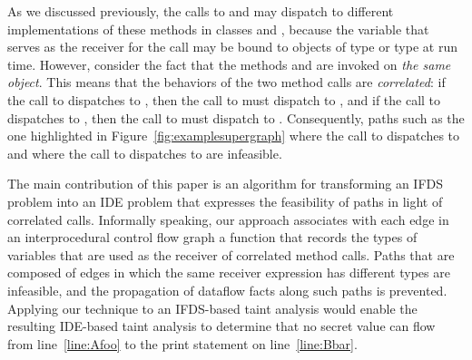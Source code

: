 As we discussed previously, the calls to  and  may dispatch
to different implementations of these methods in classes  and , 
because the variable  that serves as the receiver for the call may be bound to
 objects of type  or type  at run time. 
However, consider the fact that the methods  and  are invoked
on \textit{the same object}. This means that the behaviors of the two method calls
are \textit{correlated}: if the call to  dispatches to ,
then the call to  must dispatch to , and if the call
to  dispatches to , then the call to  must 
dispatch to .  Consequently, paths such as the one highlighted in
Figure~\ref{fig:examplesupergraph} where the call to  dispatches 
to  and where the call to  dispatches to 
are infeasible.  

The main contribution of this paper is an algorithm for transforming an IFDS problem 
into an IDE problem that expresses the feasibility of paths
in light of correlated calls.
Informally speaking, our approach associates with each edge in an
interprocedural control flow graph a function that records the types of 
variables that are used as the receiver of correlated method calls. Paths that 
are composed of edges in which the same receiver expression has different types
are infeasible, and the propagation of dataflow facts along such paths is
prevented. Applying our technique to an IFDS-based taint analysis would enable
the resulting IDE-based taint analysis to determine that no secret value can flow from
line~\ref{line:Afoo} to the print statement on line~\ref{line:Bbar}. 
 


